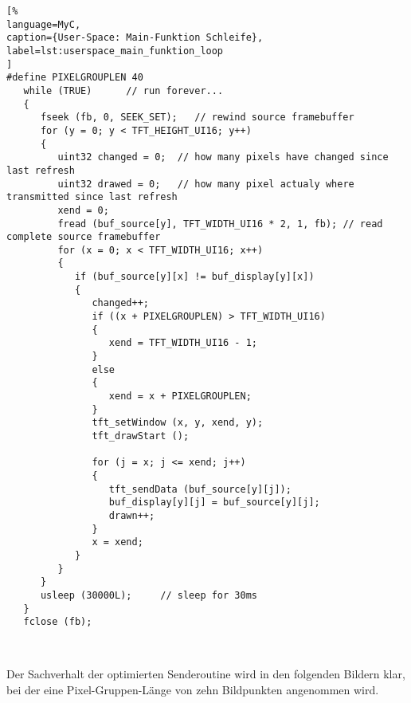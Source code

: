 \begin{lstlisting}[%
language=MyC,
caption={User-Space: Main-Funktion Schleife},
label=lst:userspace_main_funktion_loop
]
#define PIXELGROUPLEN 40
   while (TRUE)      // run forever...
   {
      fseek (fb, 0, SEEK_SET);   // rewind source framebuffer
      for (y = 0; y < TFT_HEIGHT_UI16; y++)
      {
         uint32 changed = 0;  // how many pixels have changed since last refresh
         uint32 drawed = 0;   // how many pixel actualy where transmitted since last refresh
         xend = 0;
         fread (buf_source[y], TFT_WIDTH_UI16 * 2, 1, fb); // read complete source framebuffer
         for (x = 0; x < TFT_WIDTH_UI16; x++)
         {
            if (buf_source[y][x] != buf_display[y][x])
            {
               changed++;
               if ((x + PIXELGROUPLEN) > TFT_WIDTH_UI16)
               {
                  xend = TFT_WIDTH_UI16 - 1;
               }
               else
               {
                  xend = x + PIXELGROUPLEN;
               }
               tft_setWindow (x, y, xend, y);
               tft_drawStart ();

               for (j = x; j <= xend; j++)
               {
                  tft_sendData (buf_source[y][j]);
                  buf_display[y][j] = buf_source[y][j];
                  drawn++;
               }
               x = xend;
            }
         }
      }
      usleep (30000L);     // sleep for 30ms
   }
   fclose (fb);



\end{lstlisting}
\newpage
Der Sachverhalt der optimierten Senderoutine wird in den folgenden Bildern klar, bei der eine Pixel-Gruppen-Länge von zehn Bildpunkten angenommen wird. 

